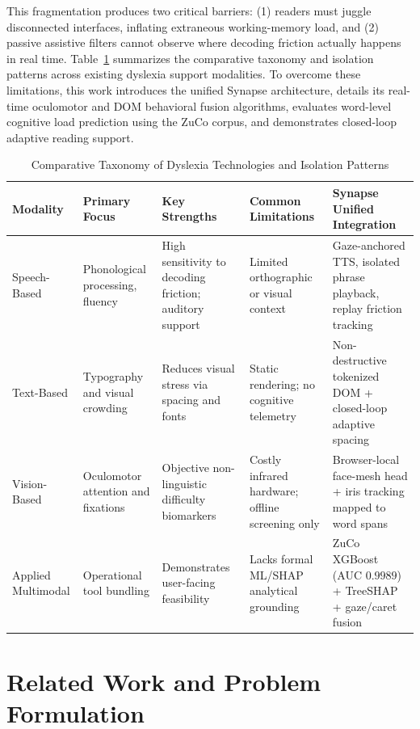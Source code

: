 \documentclass[conference]{IEEEtran}
\begin{document}
This fragmentation produces two critical barriers: (1) readers must juggle disconnected interfaces, inflating extraneous working-memory load, and (2) passive assistive filters cannot observe where decoding friction actually happens in real time. Table~\ref{tab:taxonomy} summarizes the comparative taxonomy and isolation patterns across existing dyslexia support modalities. To overcome these limitations, this work introduces the unified Synapse architecture, details its real-time oculomotor and DOM behavioral fusion algorithms, evaluates word-level cognitive load prediction using the ZuCo corpus, and demonstrates closed-loop adaptive reading support.

\begin{table}[t]
\caption{Comparative Taxonomy of Dyslexia Technologies and Isolation Patterns}
\centering
\small
\begin{tabular}{|p{2.3cm}|p{3.0cm}|p{3.3cm}|p{3.5cm}|p{3.7cm}|}
\hline
\textbf{Modality} & \textbf{Primary Focus} & \textbf{Key Strengths} & \textbf{Common Limitations} & \textbf{Synapse Unified Integration} \\
\hline
Speech-Based & Phonological processing, fluency & High sensitivity to decoding friction; auditory support & Limited orthographic or visual context & Gaze-anchored TTS, isolated phrase playback, replay friction tracking \\
\hline
Text-Based & Typography and visual crowding & Reduces visual stress via spacing and fonts & Static rendering; no cognitive telemetry & Non-destructive tokenized DOM + closed-loop adaptive spacing \\
\hline
Vision-Based & Oculomotor attention and fixations & Objective non-linguistic difficulty biomarkers & Costly infrared hardware; offline screening only & Browser-local face-mesh head + iris tracking mapped to word spans \\
\hline
Applied Multimodal & Operational tool bundling & Demonstrates user-facing feasibility & Lacks formal ML/SHAP analytical grounding & ZuCo XGBoost (AUC $0.9989$) + TreeSHAP + gaze/caret fusion \\
\hline
\end{tabular}
\label{tab:taxonomy}
\end{table}

\section{Related Work and Problem Formulation}
\end{document}
